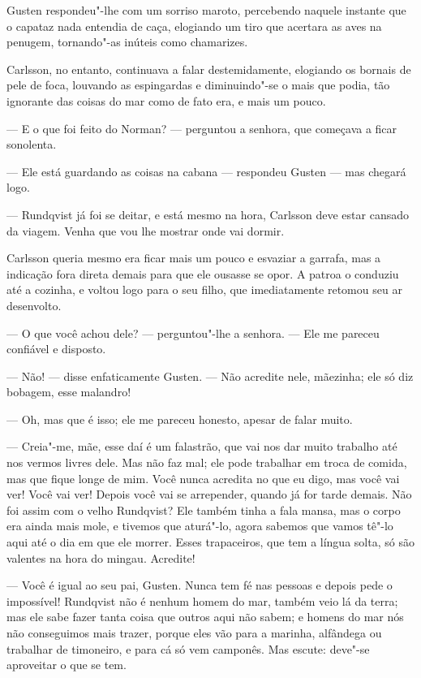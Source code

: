Gusten respondeu"-lhe com um sorriso maroto, percebendo naquele instante que o
capataz nada entendia de caça, elogiando um tiro que acertara as aves na penugem,
tornando"-as inúteis como chamarizes.

Carlsson, no entanto, continuava a falar destemidamente, elogiando os bornais de
pele de foca, louvando as espingardas e diminuindo"-se o mais que podia, tão
ignorante das coisas do mar como de fato era, e mais um pouco.

--- E o que foi feito do Norman? --- perguntou a senhora, que começava a ficar
sonolenta.

--- Ele está guardando as coisas na cabana --- respondeu Gusten --- mas chegará logo.

--- Rundqvist já foi se deitar, e está mesmo na hora, Carlsson deve estar cansado
da viagem. Venha que vou lhe mostrar onde vai dormir.

Carlsson queria mesmo era ficar mais um pouco e esvaziar a garrafa, mas a
indicação fora direta demais para que ele ousasse se opor. A patroa o conduziu
até a cozinha, e voltou logo para o seu filho, que imediatamente retomou seu ar
desenvolto.

--- O que você achou dele? --- perguntou"-lhe a senhora. --- Ele me pareceu confiável
e disposto.

--- Não! --- disse enfaticamente Gusten. --- Não acredite nele, mãezinha; ele só
diz bobagem, esse malandro!

--- Oh, mas que é isso; ele me pareceu honesto, apesar de falar muito.

--- Creia"-me, mãe, esse daí é um falastrão, que vai nos dar muito trabalho até
nos vermos livres dele. Mas não faz mal; ele pode trabalhar em troca de comida, mas que
fique longe de mim. Você nunca acredita no que eu digo, mas você vai ver! Você
vai ver! Depois você vai se arrepender, quando já for tarde demais. Não foi
assim com o velho Rundqvist? Ele também tinha a fala mansa, mas o corpo era
ainda mais mole, e tivemos que aturá"-lo, agora sabemos que vamos tê"-lo aqui até
o dia em que ele morrer. Esses trapaceiros, que tem a língua solta, só são valentes
na hora do mingau. Acredite!

--- Você é igual ao seu pai, Gusten. Nunca tem fé nas pessoas e depois pede o
impossível! Rundqvist não é nenhum homem do mar, também veio lá da terra; mas
ele sabe fazer tanta coisa que outros aqui não sabem; e homens do mar nós não
conseguimos mais trazer, porque eles vão para a marinha, alfândega ou 
trabalhar de timoneiro, e para cá só vem camponês. Mas escute: deve"-se
aproveitar o que se tem.

